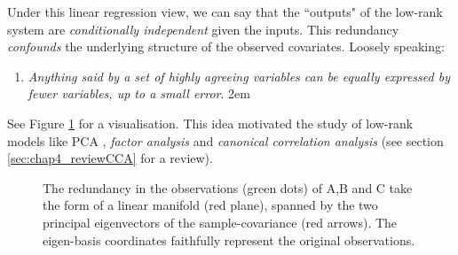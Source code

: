       Under this  linear regression view, we can say that the ``outputs" of the low-rank system are \emph{conditionally independent} given the inputs. This redundancy \emph{confounds} the underlying structure of the observed covariates.
      Loosely speaking:
      \begin{enumerate}
	\item[] \emph{Anything said by a set of highly agreeing variables can be equally expressed by fewer variables, up to a small error}.
	\rightskip2em
      \end{enumerate}
      See Figure \ref{fig:toyPCA} for a visualisation. This idea motivated the study of low-rank models like PCA \citetext{\citealp{Jolliffe:pca02}; \citealp{Hotelling:analysis33}; see also \citealp{Pearson:lines1901} for historical purposes}, \textit{factor analysis} \citep{Bartholomew:factor11, Basilevsky:factor94} and \textit{canonical correlation analysis} \citep{Hotelling:relations36} (see section \ref{sec:chap4_reviewCCA} for a review).

      \begin{figure}[!htbp]
	\centering
	\caption[PCA on a toy dataset.]{ \label{fig:toyPCA}
	  The redundancy in the observations (green dots) of A,B and C take the form of a linear manifold (red plane), spanned by the two principal eigenvectors of the sample-covariance (red arrows). The eigen-basis coordinates faithfully represent the original observations.}
      \end{figure}

